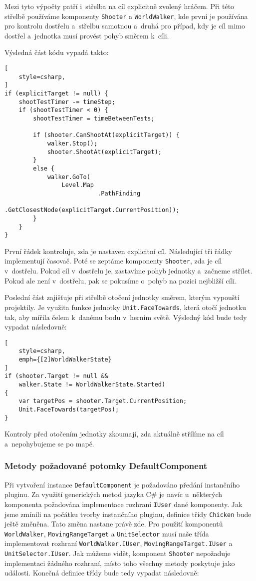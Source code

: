 Mezi tyto výpočty patří i~střelba na cíl explicitně zvolený hráčem. Při této střelbě používáme komponenty \texttt{Shooter} a \texttt{WorldWalker}, kde první je používána pro kontrolu dostřelu a~střelbu samotnou a~druhá pro případ, kdy je cíl mimo dostřel a~jednotka musí provést pohyb směrem k~cíli.

Výsledná část kódu vypadá takto:
\begin{lstlisting}[
	style=csharp,
]
if (explicitTarget != null) {
	shootTestTimer -= timeStep;
	if (shootTestTimer < 0) {
		shootTestTimer = timeBetweenTests;

		if (shooter.CanShootAt(explicitTarget)) {
			walker.Stop();
			shooter.ShootAt(explicitTarget);
		}
		else {			
			walker.GoTo(
				Level.Map
						  .PathFinding
						  .GetClosestNode(explicitTarget.CurrentPosition));
		}
	}
}
\end{lstlisting}

První řádek kontroluje, zda je nastaven explicitní cíl. Následující tři řádky implementují časovač. Poté se zeptáme komponenty \texttt{Shooter}, zda je cíl v~dostřelu. Pokud cíl v~dostřelu je, zastavíme pohyb jednotky a~začneme střílet. Pokud ale není v~dostřelu, pak se pokusíme o~pohyb na pozici nejbližší cíli.

Poslední část zajišťuje při střelbě otočení jednotky směrem, kterým vypouští projektily. Je využita funkce jednotky \texttt{Unit.FaceTowards}, která otočí jednotku tak, aby mířila čelem k~danému bodu v~herním světě. Výsledný kód bude tedy vypadat následovně:

\begin{lstlisting}[
	style=csharp,
	emph={[2]WorldWalkerState}
]
if (shooter.Target != null && 
	walker.State != WorldWalkerState.Started) 
{
	var targetPos = shooter.Target.CurrentPosition;
	Unit.FaceTowards(targetPos);
}
\end{lstlisting}

Kontroly před otočením jednotky zkoumají, zda aktuálně střílíme na cíl a~nepohybujeme se po mapě.

\subsubsection{Metody požadované potomky DefaultComponent}
Při vytvoření instance \texttt{DefaultComponent} je požadováno předání instančního pluginu. Za využití generických metod jazyka C\# je navíc u~některých komponenta požadována implementace rozhraní \texttt{IUser} dané komponenty. Jak jsme zmínili na počátku tvorby instančního pluginu, definice třídy \texttt{Chicken} bude ještě změněna. Tato změna nastane právě zde. Pro použití komponentů \texttt{WorldWalker}, \texttt{MovingRangeTarget} a \texttt{UnitSelector} musí naše třída implementovat rozhraní \texttt{WorldWalker.IUser}, \texttt{MovingRangeTarget.IUser} a \texttt{UnitSelector.IUser}. Jak můžeme vidět, komponent \texttt{Shooter} nepožaduje implementaci žádného rozhraní, místo toho všechny metody poskytuje jako události. Konečná definice třídy bude tedy vypadat následovně:

